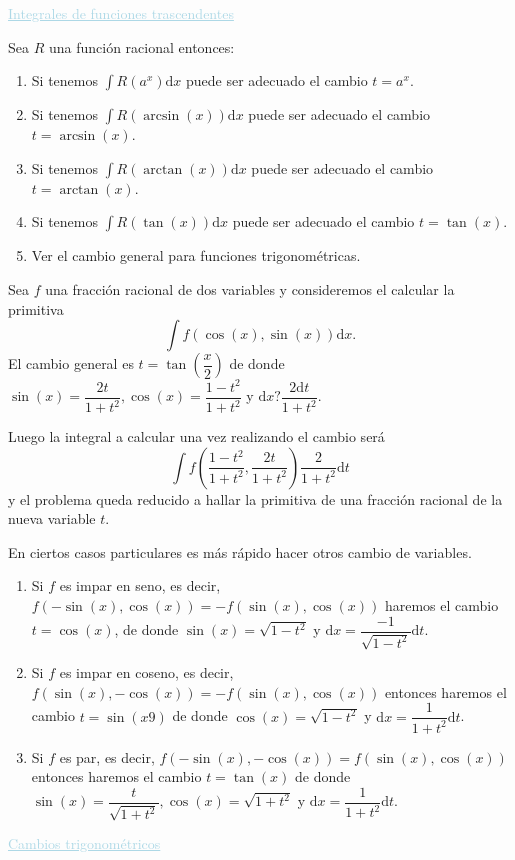 \textcolor{lightblue}{\underline{Integrales de funciones trascendentes}}

Sea $R$ una función racional entonces:
\begin{enumerate}[label=\arabic*)]
	\item Si tenemos $\int R(a^x)\mathrm{d}x$ puede ser adecuado el cambio $t=a^x$.
	\item Si tenemos $\int R(\arcsin(x))\mathrm{d}x$ puede ser adecuado el cambio $t=\arcsin(x)$.
	\item Si tenemos $\int R(\arctan(x))\mathrm{d}x$ puede ser adecuado el cambio $t=\arctan(x)$.
	\item Si tenemos $\int R(\tan(x))\mathrm{d}x$ puede ser adecuado el cambio $t=\tan(x)$.
	\item Ver el cambio general para funciones trigonométricas.
\end{enumerate}
Sea $f$ una fracción racional de dos variables y consideremos el calcular la primitiva \[ \int f(\cos(x),\sin(x))\mathrm{d}x. \] El cambio general es $t=\tan\left(\dfrac{x}{2}\right)$ de donde $\sin(x)=\dfrac{2t}{1+t^2},\cos(x)=\dfrac{1-t^2}{1+t^2}$ y $\mathrm{d}x?\dfrac{2\mathrm{d}t}{1+t^2}$. 

Luego la integral a calcular una vez realizando el cambio será \[ \int f\left(\dfrac{1-t^2}{1+t^2},\dfrac{2t}{1+t^2}\right)\dfrac{2}{1+t^2}\mathrm{d}t \] y el problema queda reducido a hallar la primitiva de una fracción racional de la nueva variable $t$.

En ciertos casos particulares es más rápido hacer otros cambio de variables. 
\begin{enumerate}[label=\arabic*)]
	\item Si $f$ es impar en seno, es decir, $f(-\sin(x), \cos(x))=-f(\sin(x),\cos(x))$ haremos el cambio $t=\cos(x)$, de donde $\sin(x)=\sqrt{1-t^2}$ y $\mathrm{d}x=\dfrac{-1}{\sqrt{1-t^2}}\mathrm{d}t$.
	\item Si $f$ es impar en coseno, es decir, $f(\sin(x),-\cos(x))=-f(\sin(x),\cos(x))$ entonces haremos el cambio $t=\sin(x9)$ de donde $\cos(x)=\sqrt{1-t^2}$ y $\mathrm{d}x=\dfrac{1}{1+t^2}\mathrm{d}t$.
	\item Si $f$ es par, es decir, $f(-\sin(x),-\cos(x))=f(\sin(x),\cos(x))$ entonces haremos el cambio $t=\tan(x)$ de donde $\sin(x)=\dfrac{t}{\sqrt{1+t^2}},\cos(x)=\sqrt{1+t^2}$ y $\mathrm{d}x=\dfrac{1}{1+t^2}\mathrm{d}t$.
\end{enumerate}
\textcolor{lightblue}{\underline{Cambios trigonométricos}}

